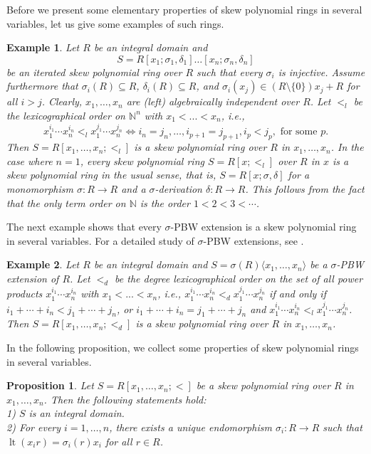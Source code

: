 \documentclass[11pt,a4paper]{article}
\theoremstyle{theorem}
\newtheorem{proposition}[theorem]{Proposition}
\newtheorem{example}{Example}[section]
\numberwithin{equation}{section}
\newcommand{\s}{\sigma}
\begin{document}
		Before we present some elementary properties of skew polynomial rings in several variables, let us give some examples of such rings. 
		\begin{example}\label{exam: iterated-skew}
			Let $R$ be an integral domain and 
			$$S=R[x_1;\s_1,\delta_1]\dots [x_n;\s_n,\delta_n]$$
			be an iterated skew polynomial ring over $R$ such that every $\s_i$ is injective. Assume furthermore that $\s_i(R)\subseteq R$, $\delta_i(R)\subseteq  R$, and $\s_i(x_j)\in (R\setminus\{0\})x_j+R$  for all $i>j$. Clearly, $x_1,\dots,x_n$ are (left) algebraically independent over $R$. Let $<_l$ be the lexicographical order on  $\mathbb{N}^n$ with $x_1<...<x_n$, i.e., 
			$$x_1^{i_1}\cdots x_n^{i_n}<_lx_1^{j_1}\cdots x_n^{j_n}\iff i_n=j_n,\dots,i_{p+1}=j_{p+1}, i_p<j_p, \text{ for some } p.$$ 
			Then  $S=R[x_1,\dots,x_n;<_l]$ is a skew polynomial ring over $R$ in $x_1,\dots,x_n$. In the case where  $n=1$, every skew polynomial ring  $S=R[x;<_l]$ over $R$ in $x$ is a skew polynomial ring in the usual sense, that is, $S=R[x;\s,\delta]$ for a monomorphism $\s:R\to R$ and a $\s$-derivation $\delta:R\to R$. This follows from the fact that the only term order on \(\mathbb{N}\) is the order 
			$1<2<3<\cdots$.
		\end{example}
		The next example shows that every $\s$-PBW extension is a skew polynomial ring in several variables. For a detailed study of $\s$-PBW extensions, see \cite{fajardo2020skew}.
		\begin{example}
			Let $R$ be an integral domain and 
			$S=\s(R)\langle x_1,\dots,x_n\rangle$ be a $\s$-PBW extension of $R$. 
			Let  $<_d$ be the degree lexicographical order on the set of all power products $x_1^{i_1}\cdots x_n^{i_n}$ with $x_1<...<x_n$, i.e., 
			$x_1^{i_1}\cdots x_n^{i_n}<_dx_1^{j_1}\cdots x_n^{j_n}$ if and only if $ i_1+\cdots+i_n<j_1+\cdots+j_n$,  or $i_1+\cdots+i_n=j_1+\cdots+j_n$ and $x_1^{i_1}\cdots x_n^{i_n}<_lx_1^{j_1}\cdots x_n^{j_n}$.
			Then  $S=R[x_1,\dots,x_n;<_d]$  is a skew polynomial ring over $R$ in $x_1,\dots,x_n$.
		\end{example}
		In the following proposition, we collect some properties of skew polynomial rings in several variables.
		\begin{proposition}\label{prop: simple-proerties-skew}
			Let $S=R[x_1,\dots,x_n;<]$ be a skew polynomial ring  over $R$ in $x_1,\dots,x_n$. Then  the following statements hold: \\
			1) $S$ is an integral domain.\\
			2) For every $i=1,\dots,n$, there exists a unique endomorphism $\s_i:R\to R$ such that  $\operatorname{lt}(x_ir)=\s_i(r)x_i$ for all $r\in R$.  
		\end{proposition}
\end{document}
